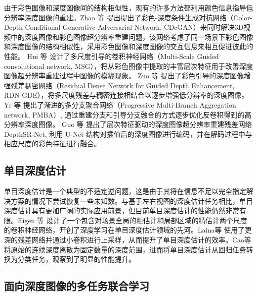 由于彩色图像和深度图像间的结构相似性，现有的许多方法都利用颜色信息指导低分辨率深度图像的重建。Zhao 等 \cite{DBLP:journals/corr/abs-1708-09105} 提出提出了彩色-深度条件生成对抗网络（Color-Depth Conditional Generative Adversarial Network, CDcGAN）来同时解决3D视频中的深度图像和彩色图像超分辨率重建问题，该网络考虑了同一场景下彩色图像和深度图像的结构相似性，采用彩色图像和深度图像的交互信息来相互促进彼此的性能。 Hui 等 \cite{HuiLT16} 设计了多尺度引导的卷积神经网络（Multi-Scale Guided convolutional network, MSG），将从彩色图像中提取的丰富层次特征用于改善深度图像超分辨率重建过程中图像的模糊现象。 Zuo 等 \cite{DBLP:journals/isci/ZuoFYSW19} 提出了彩色引导的深度图像增强残差稠密网络（Residual Dense Network for Guided Depth Enhancement, RDN-GDE），将多尺度残差与稠密连接相结合以逐步增强低分辨率的深度图像。 Ye 等 \cite{DBLP:journals/tip/YeSWYXLL20} 提出了渐进的多分支聚合网络（Progressive Multi-Branch Aggregation network, PMBA）, 通过重建分支和引导分支融合的方式逐步优化反卷积得到的高分辨率深度图像。 Guo 等 \cite{DBLP:journals/tip/GuoLGCFH19} 提出了层次特征驱动的深度图像超分辨率重建残差网络 DepthSR-Net, 利用 U-Net 结构对插值后的深度图像进行编码，并在解码过程中与相应尺度的彩色特征进行融合。

\subsection{单目深度估计}

单目深度估计是一个典型的不适定逆问题，这是由于其将在信息不足以完全指定解决方案的情况下尝试恢复一些未知数。与基于左右视图的深度估计任务相比，单目深度估计具有更加广阔的实际应用前景，但目前单目深度估计的性能仍然非常有限。Eigen 等 \cite{DBLP:conf/nips/EigenPF14} 设计了一个包含对场景全局的粗估计和局部区域的精估计两个尺度的卷积神经网络，开创了深度学习在单目深度估计领域的先河。Laina等 \cite{DBLP:conf/3dim/LainaRBTN16} 使用了更深的残差网络并通过小卷积进行上采样，从而提升了单目深度估计的效率。Cao等 \cite{DBLP:journals/tcsv/CaoWS18} 将原始的连续深度离散为固定数量的深度范围，进而将单目深度估计从回归任务转换为分类任务，观察到了明显的性能提升。

\subsection{面向深度图像的多任务联合学习}

